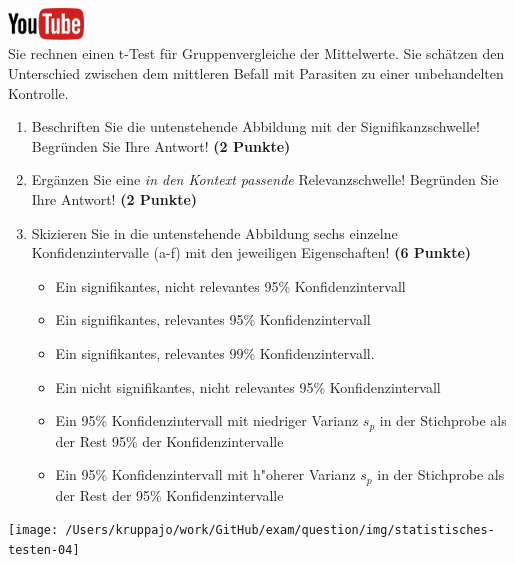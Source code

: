 \documentclass[a4paper, 9pt]{scrartcl}\usepackage[]{graphicx}\usepackage[]{xcolor}
\begin{document}
\hfill\href{https://youtu.be/CN_O4fYPbhs}{\includegraphics[width =
  2cm]{img/youtube}}\\[1Ex]



Sie rechnen einen t-Test f{\"u}r Gruppenvergleiche der Mittelwerte. Sie
sch{\"a}tzen den Unterschied zwischen dem mittleren Befall mit Parasiten zu einer unbehandelten
Kontrolle.

\begin{enumerate}
\item Beschriften Sie die untenstehende Abbildung mit der
  Signifikanzschwelle! Begr{\"u}nden Sie Ihre Antwort! \textbf{(2 Punkte)}
\item Erg{\"a}nzen Sie eine \textit{in den Kontext passende} Relevanzschwelle!
  Begr{\"u}nden Sie Ihre Antwort! \textbf{(2 Punkte)} 
\item Skizieren Sie in die
  untenstehende Abbildung sechs einzelne Konfidenzintervalle (a-f) mit den
  jeweiligen Eigenschaften! \textbf{(6 Punkte)}
  \begin{itemize}
  \item[(a)] Ein signifikantes, nicht relevantes 95\% Konfidenzintervall 	
  \item[(b)] Ein signifikantes, relevantes 95\% Konfidenzintervall 	
  \item[(c)] Ein signifikantes, relevantes 99\% Konfidenzintervall. 	
  \item[(d)] Ein nicht signifikantes, nicht relevantes 95\% Konfidenzintervall 
  \item[(e)] Ein 95\% Konfidenzintervall mit niedriger Varianz $s_p$ in der Stichprobe als der Rest 95\% der Konfidenzintervalle
  \item[(f)] Ein 95\% Konfidenzintervall mit h{"o}herer Varianz $s_p$ in der Stichprobe als der Rest der 95\% Konfidenzintervalle
  \end{itemize}
\end{enumerate}

\begin{center}
  \texttt{[image: /Users/kruppajo/work/GitHub/exam/question/img/statistisches-testen-04]}
\end{center}
\end{document}
